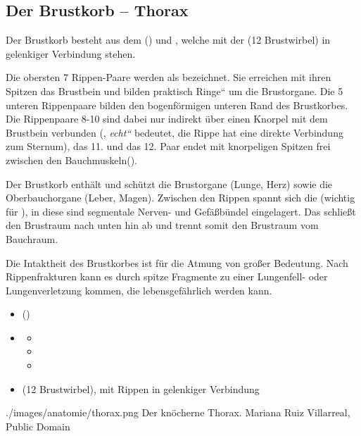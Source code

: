 \subsection{Der Brustkorb -- Thorax}



{%
Der  Brustkorb besteht  aus dem 
 () und , welche  mit der  (12
Brust\-wirbel) in gelenkiger Verbindung stehen.

Die obersten 7 Rippen-Paare werden als 
{\quotedblbase}
bezeichnet. Sie erreichen mit ihren Spitzen das Brustbein und bilden praktisch
{\quotedblbase}Ringe{\textquotedblleft} um die Brustorgane. Die 5
unteren Rippenpaare bilden den bogenförmigen unteren Rand des
Brustkorbes. Die Rippenpaare 8-10 sind dabei nur indirekt
über einen Knorpel mit dem Brustbein verbunden
({\quotedblbase},
\emph{{\quotedblbase}echt{\textquotedblleft}} bedeutet, die Rippe hat eine
direkte Verbindung zum Sternum), das 11. und das 12. Paar endet mit knorpeligen Spitzen frei zwischen den
Bauchmuskeln({\quotedblbase}).

Der Brustkorb enthält und schützt die Brust\-organe (Lunge, Herz)
sowie die Oberbauchorgane (Leber, Magen). Zwischen den
Rippen spannt sich die
 (wichtig für ), in diese sind segmentale
Nerven- und Gefäßbündel eingelagert. Das 
 schließt den Brustraum nach unten hin ab
und trennt somit den Brustraum vom Bauchraum.

Die Intaktheit des Brustkorbes ist für die Atmung von großer Bedeutung. Nach
Rippenfrakturen kann es durch spitze Fragmente zu einer
Lungenfell- oder Lungenverletzung kommen, die lebensgefährlich werden kann.




}
{%
% 
\begin{itemize}
    \item {} ()
    \item {}
    \begin{itemize}
        \item {}
        \item {}
        \item {}
    \end{itemize}
    \item {} (12 Brust\-wirbel), mit Rippen in gelenkiger Verbindung
\end{itemize}
}
{./images/anatomie/thorax.png}
{Der knöcherne Thorax.}
{Mariana Ruiz Villarreal, Public Domain}




